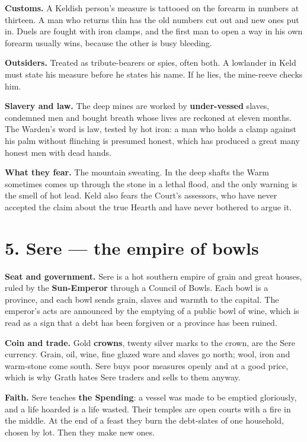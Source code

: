 \documentclass{design/chronicle}
\begin{document}
\textbf{Customs.} A Keldish person’s measure is tattooed on the forearm in numbers at thirteen. A man who returns thin has the old numbers cut out and new ones put in. Duels are fought with iron clamps, and the first man to open a way in his own forearm usually wins, because the other is busy bleeding.

\textbf{Outsiders.} Treated as tribute-bearers or spies, often both. A lowlander in Keld must state his measure before he states his name. If he lies, the mine-reeve checks him.

\textbf{Slavery and law.} The deep mines are worked by \textbf{under-vessed} slaves, condemned men and bought breath whose lives are reckoned at eleven months. The Warden’s word is law, tested by hot iron: a man who holds a clamp against his palm without flinching is presumed honest, which has produced a great many honest men with dead hands.

\textbf{What they fear.} The mountain sweating. In the deep shafts the Warm sometimes comes up through the stone in a lethal flood, and the only warning is the smell of hot lead. Keld also fears the Court’s assessors, who have never accepted the claim about the true Hearth and have never bothered to argue it.

\section*{5. Sere — the empire of bowls}

\textbf{Seat and government.} Sere is a hot southern empire of grain and great houses, ruled by the \textbf{Sun-Emperor} through a Council of Bowls. Each bowl is a province, and each bowl sends grain, slaves and warmth to the capital. The emperor’s acts are announced by the emptying of a public bowl of wine, which is read as a sign that a debt has been forgiven or a province has been ruined.

\textbf{Coin and trade.} Gold \textbf{crowns}, twenty silver marks to the crown, are the Sere currency. Grain, oil, wine, fine glazed ware and slaves go north; wool, iron and warm-stone come south. Sere buys poor measures openly and at a good price, which is why Grath hates Sere traders and sells to them anyway.

\textbf{Faith.} Sere teaches \textbf{the Spending}: a vessel was made to be emptied gloriously, and a life hoarded is a life wasted. Their temples are open courts with a fire in the middle. At the end of a feast they burn the debt-slates of one household, chosen by lot. Then they make new ones.
\end{document}
